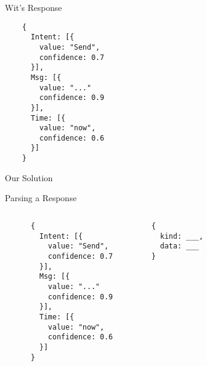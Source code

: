 \documentclass[10pt]{beamer}
\begin{document}
\begin{frame}[fragile]{Wit's Response}

  \begin{center}
    \begin{verbatim}
    {
      Intent: [{
        value: "Send",
        confidence: 0.7
      }],
      Msg: [{
        value: "..."
        confidence: 0.9
      }],
      Time: [{
        value: "now",
        confidence: 0.6
      }]
    }
    \end{verbatim}
  \end{center}
\end{frame}

\begin{frame}[fragile]{Our Solution}

  \begin{center}
  \end{center}
\end{frame}

\begin{frame}[fragile]{Parsing a Response}

  \begin{columns}
    \begin{center}
      \begin{verbatim}
      {
        Intent: [{
          value: "Send",
          confidence: 0.7
        }],
        Msg: [{
          value: "..."
          confidence: 0.9
        }],
        Time: [{
          value: "now",
          confidence: 0.6
        }]
      }
      \end{verbatim}
    \end{center}

    \begin{center}
      \begin{verbatim}
      {
        kind: ___,
        data: ___
      }
      \end{verbatim}
    \end{center}

  \end{columns}
\end{frame}
\end{document}
